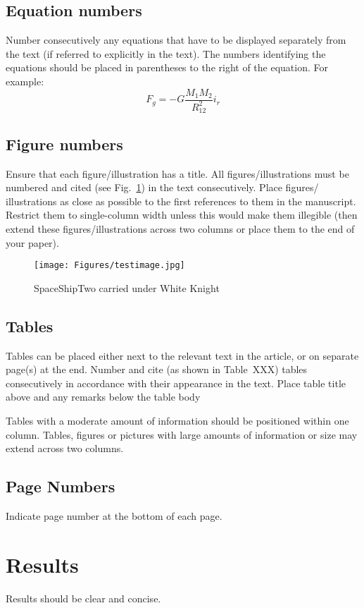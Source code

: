 \documentclass[]{iac}
\begin{document}
\subsection{Equation numbers}
Number consecutively any equations that have to be displayed separately from the text (if referred to explicitly in the text). The numbers identifying the equations should be placed in parentheses to the right of the equation. For example:
\begin{equation}\label{eq:masseq}
    F_g = -G\frac{M_1 M_2}{R_{12}^2}i_r    
\end{equation}

\subsection{Figure numbers}
Ensure that each figure/illustration has a title. All figures/illustrations must be numbered and cited (see Fig.~\ref{fig:testimage}) in the text consecutively. Place figures/ illustrations as close as possible to the first references to them in the manuscript. Restrict them to single-column width unless this would make them illegible (then extend these figures/illustrations across two columns or place them to the end of your paper). 
 \begin{figure}[H]
    \centering
    \texttt{[image: Figures/testimage.jpg]}
    \caption{SpaceShipTwo carried under White Knight}
    \label{fig:testimage}
\end{figure}

\subsection{Tables}
Tables can be placed either next to the relevant text in the article, or on separate page(s) at the end. Number and cite (as shown in Table~XXX) tables consecutively in accordance with their appearance in the text. Place table title above and any remarks below the table body

Tables with a moderate amount of information should be positioned within one column. Tables, figures or pictures with large amounts of information or size may extend across two columns.

\subsection{Page Numbers}
Indicate page number at the bottom of each page.

\section{Results}
Results should be clear and concise.
\end{document}
